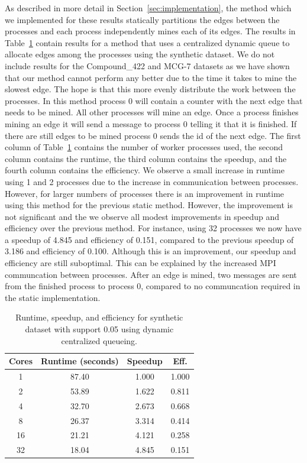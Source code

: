 As described in more detail in Section~\ref{sec:implementation}, the method which we implemented for these results statically partitions
the edges between the processes and each process independently mines each of
its edges. The results in Table~\ref{tab:synth_dyn} contain results for a
method that uses a centralized dynamic queue to allocate edges among the
processes using the synthetic dataset. We do not include results for the
Compound\_422 and MCG-7 datasets as we have shown that our method cannot
perform any better due to the time it takes to mine the slowest edge.
The hope is that this more evenly
distribute the work between the processes. In this method process 0 will
contain a counter with the next edge that needs to be mined. All other
processes will mine an edge. Once a process finishes mining an edge it will
send a message to process 0 telling it that it is finished. If there are still
edges to be mined process 0 sends the id of the next edge. The first column of
Table~\ref{tab:synth_dyn} contains the number of worker processes used, the
second column contains the runtime, the third column contains the speedup, and
the fourth column contains the efficiency.
We observe a small increase in runtime using 1 and 2 processes due to the
increase in communication between processes. However, for larger numbers of
processes there is an improvement in runtime using this method for the
previous static method. However, the improvement is not significant and the
we observe all modest improvements in speedup and efficiency over the previous
method. For instance, using 32 processes we now have a speedup of 4.845 and
efficiency of 0.151, compared to the previous speedup of 3.186 and efficiency
of 0.100. Although this is an improvement, our speedup and efficiency are still
suboptimal. This can be explained by the increased MPI communcation between
processes. After an edge is mined, two messages are sent from the finished process
to process 0, compared to no communcation required in the static implementation.


\begin{table}
\centering
\begin{tabular}{cccc}
\hline
Cores & Runtime (seconds) & Speedup &  Eff.  \\
\hline
1   &    87.40   &     1.000  &    1.000   \\ 
2   &    53.89   &     1.622  &    0.811   \\
4   &    32.70   &     2.673  &    0.668   \\
8   &    26.37   &     3.314  &    0.414   \\
16  &    21.21   &     4.121  &    0.258   \\
32  &    18.04   &     4.845  &    0.151   \\
\hline
\end{tabular}
\caption{Runtime, speedup, and efficiency for synthetic dataset with support
         0.05 using dynamic centralized queueing.}
\label{tab:synth_dyn}
\end{table}

